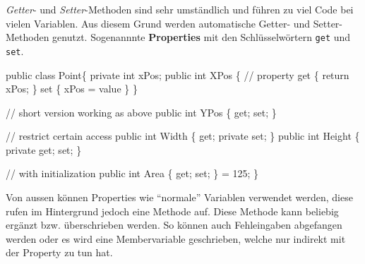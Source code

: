 \documentclass[
  9pt,
  a4paperpaper,
  DIV=11]{scrartcl}
\newenvironment{Shaded}{}{}
\newcommand{\CommentTok}[1]{\textcolor[rgb]{0.42,0.45,0.49}{#1}}
\newcommand{\DataTypeTok}[1]{\textcolor[rgb]{0.84,0.23,0.29}{#1}}
\newcommand{\DecValTok}[1]{\textcolor[rgb]{0.00,0.36,0.77}{#1}}
\newcommand{\KeywordTok}[1]{\textcolor[rgb]{0.84,0.23,0.29}{#1}}
\newcommand{\NormalTok}[1]{\textcolor[rgb]{0.14,0.16,0.18}{#1}}
\newcommand{\OperatorTok}[1]{\textcolor[rgb]{0.14,0.16,0.18}{#1}}
\numberwithin{equation}{section}
\begin{document}
\begin{multicols}{2}
\emph{Getter}- und \emph{Setter}-Methoden sind sehr umständlich und
führen zu viel Code bei vielen Variablen. Aus diesem Grund werden
automatische Getter- und Setter-Methoden genutzt. Sogenannnte
\textbf{Properties} mit den Schlüsselwörtern \texttt{get} und
\texttt{set}.

\begin{Shaded}
\begin{Highlighting}[]
\KeywordTok{public} \KeywordTok{class}\NormalTok{ Point}\OperatorTok{\{}
  \KeywordTok{private} \DataTypeTok{int}\NormalTok{ xPos}\OperatorTok{;}
  \KeywordTok{public} \DataTypeTok{int}\NormalTok{ XPos }\OperatorTok{\{}    \CommentTok{// property}
    \KeywordTok{get} \OperatorTok{\{} \KeywordTok{return}\NormalTok{ xPos}\OperatorTok{;} \OperatorTok{\}}
    \KeywordTok{set} \OperatorTok{\{}\NormalTok{ xPos }\OperatorTok{=}\NormalTok{ value }\OperatorTok{\}}
  \OperatorTok{\}}

  \CommentTok{// short version working as above}
  \KeywordTok{public} \DataTypeTok{int}\NormalTok{ YPos }\OperatorTok{\{} \KeywordTok{get}\OperatorTok{;} \KeywordTok{set}\OperatorTok{;} \OperatorTok{\}}

  \CommentTok{// restrict certain access}
  \KeywordTok{public} \DataTypeTok{int}\NormalTok{ Width }\OperatorTok{\{} \KeywordTok{get}\OperatorTok{;} \KeywordTok{private} \KeywordTok{set}\OperatorTok{;} \OperatorTok{\}}
  \KeywordTok{public} \DataTypeTok{int}\NormalTok{ Height }\OperatorTok{\{} \KeywordTok{private} \KeywordTok{get}\OperatorTok{;} \KeywordTok{set}\OperatorTok{;} \OperatorTok{\}}

  \CommentTok{// with initialization}
  \KeywordTok{public} \DataTypeTok{int}\NormalTok{ Area }\OperatorTok{\{} \KeywordTok{get}\OperatorTok{;} \KeywordTok{set}\OperatorTok{;} \OperatorTok{\}} \OperatorTok{=} \DecValTok{125}\OperatorTok{;}
\OperatorTok{\}}
\end{Highlighting}
\end{Shaded}

Von aussen können Properties wie ``normale'' Variablen verwendet werden,
diese rufen im Hintergrund jedoch eine Methode auf. Diese Methode kann
beliebig ergänzt bzw. überschrieben werden. So können auch Fehleingaben
abgefangen werden oder es wird eine Membervariable geschrieben, welche
nur indirekt mit der Property zu tun hat.


\end{multicols}
\end{document}
